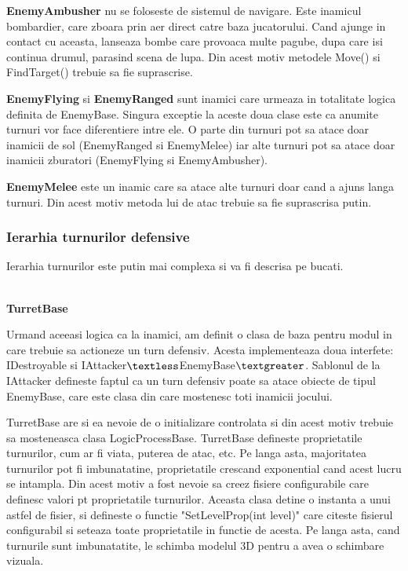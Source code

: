 \documentclass[12pt, a4paper]{article}
\begin{document}
	\textbf{EnemyAmbusher} nu se foloseste de sistemul de navigare. Este inamicul bombardier, care zboara prin aer direct catre baza jucatorului. Cand ajunge in contact cu aceasta, lanseaza bombe care provoaca multe pagube, dupa care isi continua drumul, parasind scena de lupa. Din acest motiv metodele Move() si FindTarget() trebuie sa fie suprascrise.
	\newline
	
	\textbf{EnemyFlying} si \textbf{EnemyRanged} sunt inamici care urmeaza in totalitate logica definita de EnemyBase. Singura exceptie la aceste doua clase este ca anumite turnuri vor face diferentiere intre ele. O parte din turnuri pot sa atace doar inamicii de sol (EnemyRanged si EnemyMelee) iar alte turnuri pot sa atace doar inamicii zburatori (EnemyFlying si EnemyAmbusher).
	\newline
	
	\textbf{EnemyMelee} este un inamic care sa atace alte turnuri doar cand a ajuns langa turnuri. Din acest motiv metoda lui de atac trebuie sa fie suprascrisa putin.
	
	
	
	
	
	\subsubsection{Ierarhia turnurilor defensive}
	\label{section: turretHierachy}
	
	Ierarhia turnurilor este putin mai complexa si va fi descrisa pe bucati.
	
	\ \\
	\textbf{TurretBase}
	
	Urmand aceeasi logica ca la inamici, am definit o clasa de baza pentru modul in care trebuie sa actioneze un turn defensiv. Acesta implementeaza doua interfete: IDestroyable si IAttacker$\textless$EnemyBase$\textgreater$. Sablonul de la IAttacker defineste faptul ca un turn defensiv poate sa atace obiecte de tipul EnemyBase, care este clasa din care mostenesc toti inamicii jocului.
	\newline
	
	TurretBase are si ea nevoie de o initializare controlata si din acest motiv trebuie sa mosteneasca clasa LogicProcessBase. TurretBase defineste proprietatile turnurilor, cum ar fi viata, puterea de atac, etc. Pe langa asta, majoritatea turnurilor pot fi imbunatatine, proprietatile crescand exponential cand acest lucru se intampla. Din acest motiv a fost nevoie sa creez fisiere configurabile care definesc valori pt proprietatile turnurilor. Aceasta clasa detine o instanta a unui astfel de fisier, si defineste o functie "SetLevelProp(int level)" care citeste fisierul configurabil si seteaza toate proprietatile in functie de acesta. Pe langa asta, cand turnurile sunt imbunatatite, le schimba modelul 3D pentru a avea o schimbare vizuala.
	\newline
	
\end{document}
